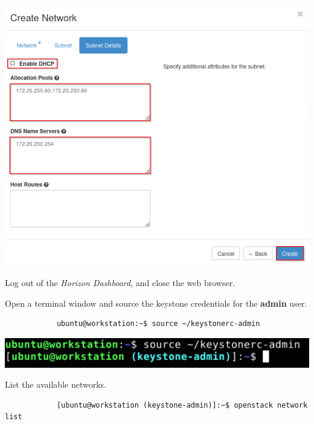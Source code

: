 \documentclass[letterpaper, 12pt]{article}
\begin{document}
\begin{enumerate}
\begin{labstep}
        \begin{center}
            \includegraphics[width=\linewidth]{images/part1/step9.png}
        \end{center}
    \end{labstep}

    \begin{labstep}
        Log out of the \textit{Horizon Dashboard}, and close the web browser.
    \end{labstep}

    \begin{labstep}
        Open a terminal window and source the keystone credentials for the \textbf{admin} user.
        \begin{lstlisting}
            ubuntu@workstation:~$ source ~/keystonerc-admin
        \end{lstlisting}

        \begin{center}
            \includegraphics[width=\linewidth]{images/part1/step11.png}
        \end{center}
    \end{labstep}

    \begin{labstep}
        List the available networks.
        \begin{lstlisting}
            [ubuntu@workstation (keystone-admin)]:~$ openstack network list
        \end{lstlisting}


\end{labstep}
\end{enumerate}
\end{document}
